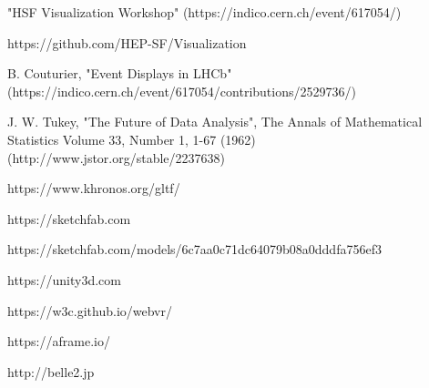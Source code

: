 \documentclass[12pt,a4paper]{article}
\begin{document}
\begin{thebibliography}{999}
 "HSF Visualization Workshop" (https://indico.cern.ch/event/617054/)

 https://github.com/HEP-SF/Visualization



 B. Couturier, "Event Displays in LHCb" (https://indico.cern.ch/event/617054/contributions/2529736/)

 J. W. Tukey, "The Future of Data Analysis", The Annals of Mathematical Statistics Volume 33, Number 1, 1-67 (1962) (http://www.jstor.org/stable/2237638)

 https://www.khronos.org/gltf/

 https://sketchfab.com

 https://sketchfab.com/models/6c7aa0c71dc64079b08a0dddfa756ef3

 https://unity3d.com

 https://w3c.github.io/webvr/

 https://aframe.io/

 http://belle2.jp

\end{thebibliography}

\sloppy
\raggedright
\clearpage
\end{document}
